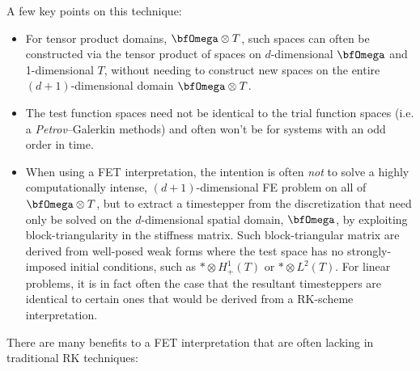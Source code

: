     A few key points on this technique:
    \begin{itemize}
        \item  For tensor product domains, $\bfOmega\otimes T$, such spaces can often be constructed via the tensor product of spaces on $d$-dimensional $\bfOmega$ and 1-dimensional $T$, without needing to construct new spaces on the entire $(d + 1)$-dimensional domain $\bfOmega\otimes T$.
        \item  The test function spaces need not be identical to the trial function spaces (i.e. a \emph{Petrov}–Galerkin methods) and often won't be for systems with an odd order in time.
        \item  When using a FET interpretation, the intention is often \emph{not} to solve a highly computationally intense, $(d + 1)$-dimensional FE problem on all of $\bfOmega\otimes T$, but to extract a timestepper from the discretization that need only be solved on the $d$-dimensional spatial domain, $\bfOmega$, by exploiting block-triangularity in the stiffness  matrix. Such block-triangular matrix are derived from well-posed weak forms where the test space has no strongly-imposed initial conditions, such as $*\otimes H^{1}_{+}(T)$ or $*\otimes L^{2}(T)$.  For linear problems, it is in fact often the case that the resultant timesteppers are identical to certain ones that would be derived from a RK-scheme interpretation.
    \end{itemize}
    There are many benefits to a FET interpretation that are often lacking in traditional RK techniques:
